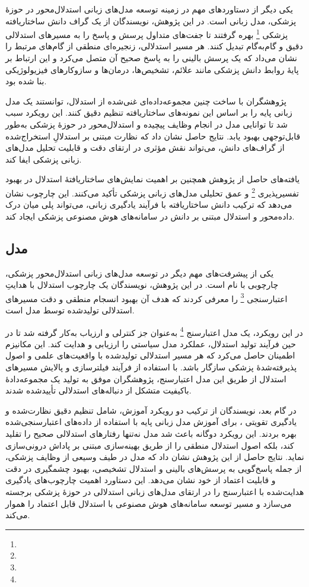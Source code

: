 یکی دیگر از دستاوردهای مهم در زمینه توسعه مدل‌های زبانی استدلال‌محور در حوزهٔ پزشکی، مدل زبانی
است.
\cite{b51}
در این پژوهش، نویسندگان از یک گراف دانش ساختاریافته پزشکی
\footnote{}
بهره گرفتند تا جفت‌های متداول پرسش و پاسخ را به مسیرهای استدلالی دقیق و گام‌به‌گام تبدیل کنند. هر مسیر استدلالی، زنجیره‌ای منطقی از گام‌های مرتبط را نشان می‌داد که یک پرسش بالینی را به پاسخ صحیح آن متصل می‌کرد و این ارتباط بر پایهٔ روابط دانش پزشکی مانند علائم، تشخیص‌ها، درمان‌ها و سازوکارهای فیزیولوژیکی بنا شده بود.

پژوهشگران با ساخت چنین مجموعه‌داده‌ای غنی‌شده از استدلال، توانستند یک مدل زبانی پایه را بر اساس این نمونه‌های ساختاریافته تنظیم دقیق کنند. این رویکرد سبب شد تا توانایی مدل در انجام وظایف پیچیده و استدلال‌محور در حوزهٔ پزشکی به‌طور قابل‌توجهی بهبود یابد. نتایج حاصل نشان داد که نظارت مبتنی بر استدلالِ استخراج‌شده از گراف‌های دانش، می‌تواند نقش مؤثری در ارتقای دقت و قابلیت تحلیل مدل‌های زبانی پزشکی ایفا کند.

یافته‌های حاصل از پژوهش
همچنین بر اهمیت نمایش‌های ساختاریافتهٔ استدلال در بهبود تفسیرپذیری
\footnote{}
و عمق تحلیلی مدل‌های زبانی پزشکی تأکید می‌کنند. این چارچوب نشان می‌دهد که ترکیب دانش ساختاریافته با فرآیند یادگیری زبانی، می‌تواند پلی میان درک داده‌محور و استدلال مبتنی بر دانش در سامانه‌های هوش مصنوعی پزشکی ایجاد کند.


\subsection{
مدل 
}
یکی از پیشرفت‌های مهم دیگر در توسعه مدل‌های زبانی استدلال‌محور پزشکی، چارچوبی با نام
است.
\cite{b52}
در این پژوهش، نویسندگان یک چارچوب استدلال با هدایتِ اعتبارسنجی
\footnote{}
را معرفی کردند که هدف آن بهبود انسجام منطقی و دقت مسیرهای استدلالی تولیدشده توسط مدل است. 

در این رویکرد، یک مدل اعتبارسنج
\footnote{}
به‌عنوان جز کنترلی و ارزیاب به‌کار گرفته شد تا در حین فرآیند تولید استدلال، عملکرد مدل سیاستی را ارزیابی و هدایت کند. این مکانیزم اطمینان حاصل می‌کرد که هر مسیر استدلالی تولیدشده با واقعیت‌های علمی و اصول پذیرفته‌شدهٔ پزشکی سازگار باشد. با استفاده از فرآیند فیلترسازی و پالایش مسیرهای استدلال از طریق این مدل اعتبارسنج، پژوهشگران موفق به تولید یک مجموعه‌دادهٔ باکیفیت متشکل از دنباله‌های استدلالی تأییدشده شدند.

در گام بعد، نویسندگان از ترکیب دو رویکرد آموزش، شامل تنظیم دقیق نظارت‌شده  و یادگیری تقویتی ، برای آموزش مدل زبانی پایه با استفاده از داده‌های اعتبارسنجی‌شده بهره بردند. این رویکرد دوگانه باعث شد مدل نه‌تنها رفتارهای استدلالی صحیح را تقلید کند، بلکه اصول استدلال منطقی را از طریق بهینه‌سازی مبتنی بر پاداش درونی‌سازی نماید. 
نتایج حاصل از این پژوهش نشان داد که مدل
در طیف وسیعی از وظایف پزشکی، از جمله پاسخ‌گویی به پرسش‌های بالینی و استدلال تشخیصی، بهبود چشمگیری در دقت و قابلیت اعتماد از خود نشان می‌دهد. این دستاورد اهمیت چارچوب‌های یادگیری هدایت‌شده با اعتبارسنج را در ارتقای مدل‌های زبانی استدلالی در حوزهٔ پزشکی برجسته می‌سازد و مسیر توسعه سامانه‌های هوش مصنوعی با استدلال قابل اعتماد را هموار می‌کند.

